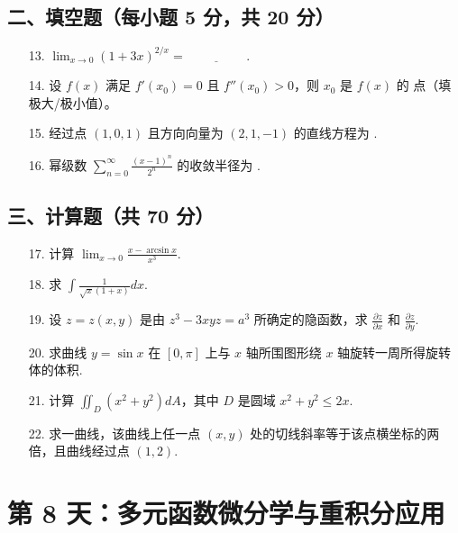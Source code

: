 \documentclass[11pt,a4paper]{article}
\begin{document}
\subsection*{二、填空题（每小题 5 分，共 20 分）}
\begin{enumerate}
    \item[13.] $\lim_{x \to 0} (1+3x)^{2/x} = \underline{\hspace{2cm}}$.
    \item[14.] 设 $f(x)$ 满足 $f'(x_0) = 0$ 且 $f''(x_0) > 0$，则 $x_0$ 是 $f(x)$ 的 \underline{\hspace{2cm}} 点（填极大/极小值）。
    \item[15.] 经过点 $(1,0,1)$ 且方向向量为 $(2,1,-1)$ 的直线方程为 \underline{\hspace{2cm}}.
    \item[16.] 幂级数 $\sum_{n=0}^{\infty} \frac{(x-1)^n}{2^n}$ 的收敛半径为 \underline{\hspace{2cm}}.
\end{enumerate}
\subsection*{三、计算题（共 70 分）}
\begin{enumerate}
    \item[17.] 计算 $\lim_{x \to 0} \frac{x - \arcsin x}{x^3}$.
    \item[18.] 求 $\int \frac{1}{\sqrt{x}(1+x)} dx$.
    \item[19.] 设 $z = z(x,y)$ 是由 $z^3 - 3xyz = a^3$ 所确定的隐函数，求 $\frac{\partial z}{\partial x}$ 和 $\frac{\partial z}{\partial y}$.
    \item[20.] 求曲线 $y = \sin x$ 在 $[0, \pi]$ 上与 $x$ 轴所围图形绕 $x$ 轴旋转一周所得旋转体的体积.
    \item[21.] 计算 $\iint_D (x^2+y^2) dA$，其中 $D$ 是圆域 $x^2+y^2 \le 2x$.
    \item[22.] 求一曲线，该曲线上任一点 $(x,y)$ 处的切线斜率等于该点横坐标的两倍，且曲线经过点 $(1,2)$.
\end{enumerate}

\newpage

\section*{第 8 天：多元函数微分学与重积分应用}
\end{document}
